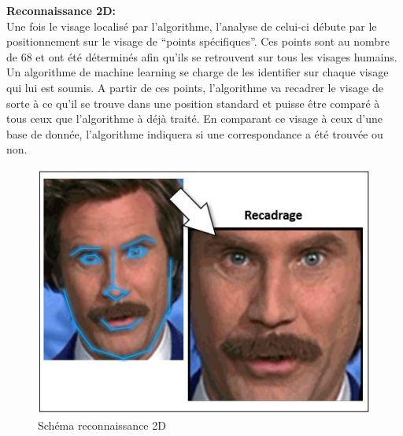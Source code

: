 \documentclass{beamer}
\begin{document}
\begin{columns}

	\begin{column}{.3\textwidth}
	\color{blancCreme}
   {\bf Reconnaissance 2D:}\\
Une fois le visage localisé par l’algorithme, l’analyse de celui-ci débute par le positionnement sur le visage de “points spécifiques”. Ces points sont au nombre de 68 et ont été déterminés afin qu’ils se retrouvent sur tous les visages humains.  Un algorithme de machine learning se charge de les identifier sur chaque visage qui lui est soumis. A partir de ces points, l’algorithme va recadrer le visage de sorte à ce qu’il se trouve dans une position standard et puisse être comparé à tous ceux que l’algorithme à déjà traité. En comparant ce visage à ceux d’une base de donnée, l’algorithme indiquera si une correspondance a été trouvée ou non.\par
	\begin{figure}
	\color{blancCreme}
		\caption{Schéma reconnaissance 2D}
		\includegraphics[width=15cm]{Reco2D.jpg}
	\end{figure}
	\end{column}
	

\end{columns}
\end{document}
